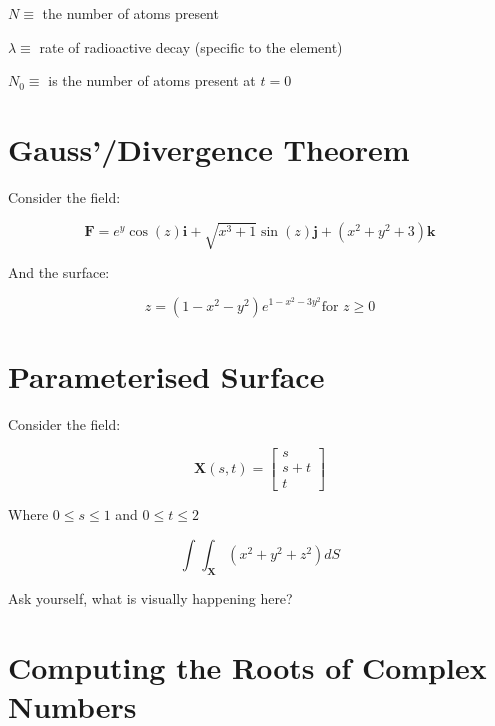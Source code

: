 \documentclass{article}
\begin{document}
$N \equiv$ the number of atoms present

$\lambda \equiv$ rate of radioactive decay (specific to the element)

$N_{0} \equiv$ is the number of atoms present at $t=0$

\clearpage
\section{Gauss'/Divergence Theorem}
Consider the field:

\begin{equation}
  \mathbf{F} = e^{y}_{} \cos(z) \mathbf{i} + 
  \sqrt{x^{3}_{} + 1} \sin(z)  \mathbf{j} +
  ( x^{2}_{} + y^{2}_{} + 3 )  \mathbf{k}
\end{equation}

And the surface:

\begin{equation}
  z = (1- x^{2}_{} - y^{2}_{} ) e^{1 - x^{2}_{} - 3y^{2}_{}}_{} 
  \text{for } z \geq 0
\end{equation}


\clearpage
\section{Parameterised Surface}

Consider the field:

\begin{equation}
  \mathbf{X}(s,t) = \begin{bmatrix} s \\ s+t \\ t  \end{bmatrix}
\end{equation}

Where $0 \leq s \leq 1$ and $0 \leq t \leq 2$

\begin{equation}
  \int^{}_{}  \int^{}_{\mathbf{X}} \left( x^{2} + y^{2} + z^{2}  \right) dS
\end{equation}

Ask yourself, what is visually happening here?

\clearpage
\section{Computing the Roots of Complex Numbers}
\end{document}
